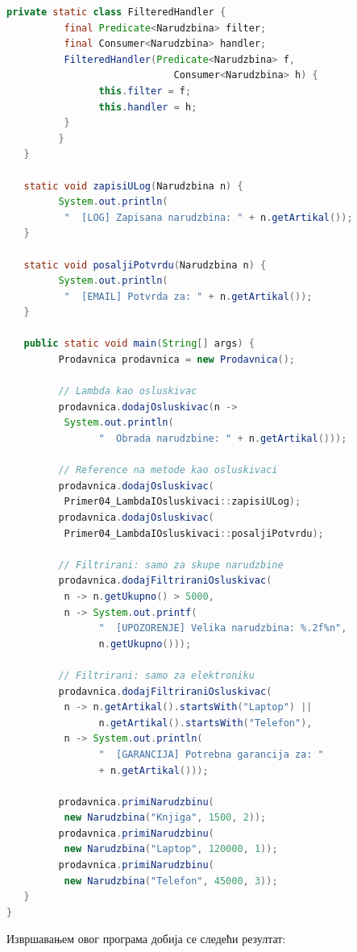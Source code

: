 \begin{lstlisting}[language=Java]
         private static class FilteredHandler {
          final Predicate<Narudzbina> filter;
          final Consumer<Narudzbina> handler;
          FilteredHandler(Predicate<Narudzbina> f,
                             Consumer<Narudzbina> h) {
                this.filter = f;
                this.handler = h;
          }
         }
   }
 
   static void zapisiULog(Narudzbina n) {
         System.out.println(
          "  [LOG] Zapisana narudzbina: " + n.getArtikal());
   }
 
   static void posaljiPotvrdu(Narudzbina n) {
         System.out.println(
          "  [EMAIL] Potvrda za: " + n.getArtikal());
   }
 
   public static void main(String[] args) {
         Prodavnica prodavnica = new Prodavnica();
 
         // Lambda kao osluskivac
         prodavnica.dodajOsluskivac(n ->
          System.out.println(
                "  Obrada narudzbine: " + n.getArtikal()));
 
         // Reference na metode kao osluskivaci
         prodavnica.dodajOsluskivac(
          Primer04_LambdaIOsluskivaci::zapisiULog);
         prodavnica.dodajOsluskivac(
          Primer04_LambdaIOsluskivaci::posaljiPotvrdu);
 
         // Filtrirani: samo za skupe narudzbine
         prodavnica.dodajFiltriraniOsluskivac(
          n -> n.getUkupno() > 5000,
          n -> System.out.printf(
                "  [UPOZORENJE] Velika narudzbina: %.2f%n",
                n.getUkupno()));
 
         // Filtrirani: samo za elektroniku
         prodavnica.dodajFiltriraniOsluskivac(
          n -> n.getArtikal().startsWith("Laptop") ||
                n.getArtikal().startsWith("Telefon"),
          n -> System.out.println(
                "  [GARANCIJA] Potrebna garancija za: "
                + n.getArtikal()));
 
         prodavnica.primiNarudzbinu(
          new Narudzbina("Knjiga", 1500, 2));
         prodavnica.primiNarudzbinu(
          new Narudzbina("Laptop", 120000, 1));
         prodavnica.primiNarudzbinu(
          new Narudzbina("Telefon", 45000, 3));
   }
}
\end{lstlisting}


Извршавањем овог програма добија се следећи резултат:


